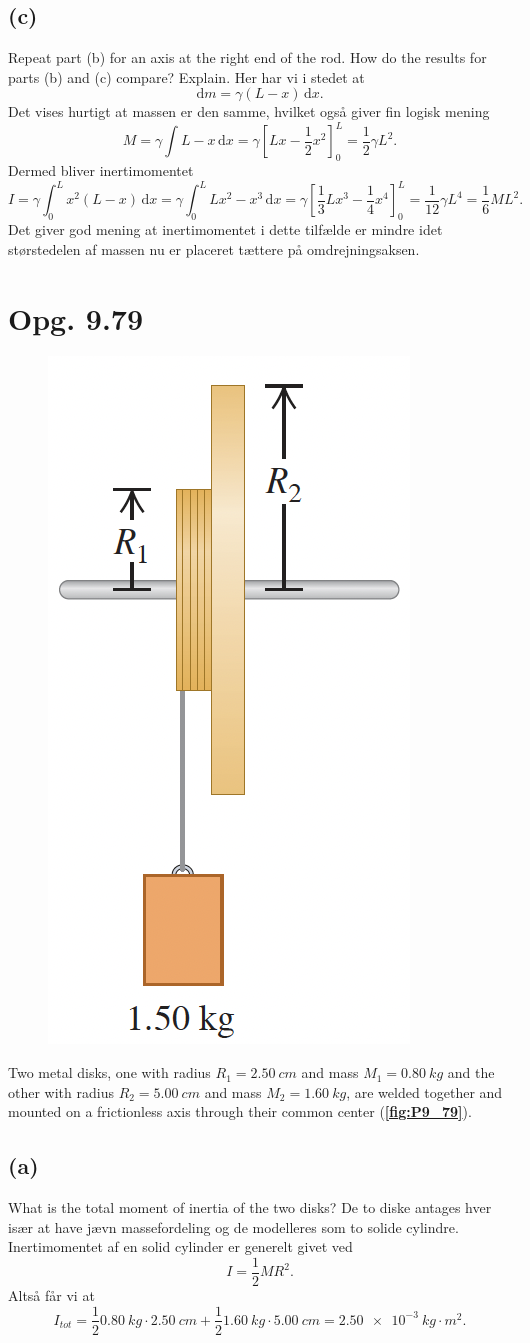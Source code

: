 \documentclass[12pt]{article}
\begin{document}
\subsection*{(c)}
Repeat part (b) for an axis at the right end of the rod. How do the results for parts (b) and (c) compare? Explain.
\bigbreak
Her har vi i stedet at
\[
\mathrm{d}m = \gamma\left( L-x \right) \, \mathrm{d}x
.\] 
Det vises hurtigt at massen er den samme, hvilket også giver fin logisk mening
\[
M = \gamma \int L-x \, \mathrm{d}x  = \gamma \left[ Lx - \frac{1}{2}x^2 \right]_0^L = \frac{1}{2}\gamma L^2 
.\] 
Dermed bliver inertimomentet
\[
I = \gamma \int_0^L x^2(L-x) \, \mathrm{d}x = \gamma \int_0^L Lx^2-x^3 \, \mathrm{d}x = \gamma \left[ \frac{1}{3}Lx^3 - \frac{1}{4}x^4 \right]_0^{L} = \frac{1}{12}\gamma L^4 = \frac{1}{6}ML^2 
.\] 
Det giver god mening at inertimomentet i dette tilfælde er mindre idet størstedelen af massen nu er placeret tættere på omdrejningsaksen.

\section*{Opg. 9.79}

\begin{figure} [ht]
  \centering
  \caption{}
  \includegraphics[width=0.25\linewidth]{../figures/P9_79.png}
  \label{fig:P9_79}
\end{figure}

Two metal disks, one with radius $R_1 = \qty{2,50}{cm}$ and mass $M_1 = \qty{0,80}{kg}$ and the other with radius $R_2 = \qty{5,00}{cm}$ and mass $M_2 = \qty{1,60}{kg}$, are welded together and mounted on a frictionless axis through their common center (\textbf{\autoref{fig:P9_79}}).


\subsection*{(a)}
What is the total moment of inertia of the two disks?
\bigbreak
De to diske antages hver især at have jævn massefordeling og de modelleres som to solide cylindre. Inertimomentet af en solid cylinder er generelt givet ved
\[
I = \frac{1}{2}MR^2 
.\]
Altså får vi at
\[
  I_{tot} = \frac{1}{2}\qty{0,80}{kg}\cdot \qty{2,50}{cm} + \frac{1}{2}\qty{1,60}{kg}\cdot \qty{5,00}{cm} = \qty{2,50e-3}{kg\cdot m^2}
.\] 
\end{document}
